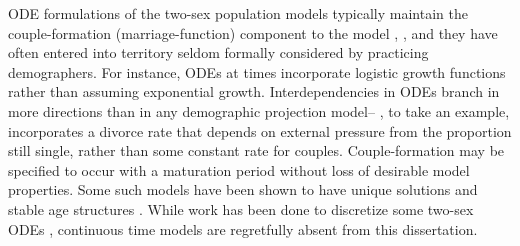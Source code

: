 ODE formulations of the two-sex population models typically maintain the
couple-formation (marriage-function) component to the model
\citep{Fredrickson1971,inaba1992age}, 
\citep[see e.g.][for a good overview]{ianelli2005gender}, and they have often entered into
territory seldom formally considered by practicing demographers. For instance,
ODEs at times incorporate logistic growth
functions\citep{castillo1995logistic,yang2009logisticwb,yang2009logistic} rather
than assuming exponential growth\citep{martcheva1999exponential}. Interdependencies in ODEs branch in more directions than in any demographic
projection model-- \citet{maxin2010two}, to take an example, incorporates a
divorce rate that depends on external pressure from the proportion still single,
rather than some constant rate for couples. Couple-formation may be
specified to occur with a maturation period without
loss of desirable model properties\citep{hadeler1993pair}. Some such models have
been shown to have unique solutions \citep{martcheva1999two} and stable age
structures \citep{inaba2000persistent}. While work has been done to
discretize some two-sex ODEs \citep{arbogast1989finite,
martcheva2001mathematics, ianelli2005gender}, continuous time models are
regretfully absent from this dissertation.

